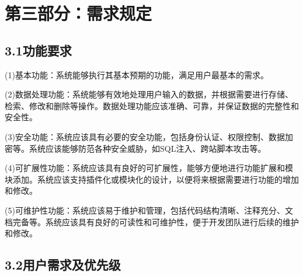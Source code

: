 \documentclass[24pt,a4paper]{article}%
\begin{document}
\section*{\songti 第三部分：需求规定}

\subsection*{\songti 3.1功能要求}
\noindent (1)基本功能：系统能够执行其基本预期的功能，满足用户最基本的需求。 \par
\noindent (2)数据处理功能：系统能够有效地处理用户输入的数据，并根据需要进行存储、检索、修改和删除等操作。数据处理功能应该准确、可靠，并保证数据的完整性和安全性。\par
\noindent (3)安全功能：系统应该具有必要的安全功能，包括身份认证、权限控制、数据加密等。系统应该能够防范各种安全威胁，如SQL注入、跨站脚本攻击等。\par
\noindent (4)可扩展性功能：系统应该具有良好的可扩展性，能够方便地进行功能扩展和模块添加。系统应该支持插件化或模块化的设计，以便将来根据需要进行功能的增加和修改。\par
\noindent (5)可维护性功能：系统应该易于维护和管理，包括代码结构清晰、注释充分、文档完备等。系统应该具有良好的可读性和可维护性，便于开发团队进行后续的维护和修改。

\subsection*{\songti 3.2用户需求及优先级}
\end{document}
